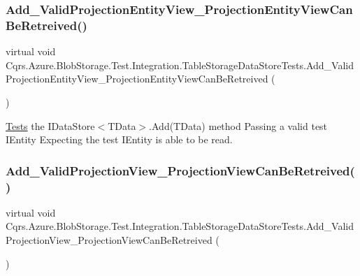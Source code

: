 \subsubsection{\texorpdfstring{Add\+\_\+\+Valid\+Projection\+Entity\+View\+\_\+\+Projection\+Entity\+View\+Can\+Be\+Retreived()}{Add\_ValidProjectionEntityView\_ProjectionEntityViewCanBeRetreived()}}
{\footnotesize\ttfamily virtual void Cqrs.\+Azure.\+Blob\+Storage.\+Test.\+Integration.\+Table\+Storage\+Data\+Store\+Tests.\+Add\+\_\+\+Valid\+Projection\+Entity\+View\+\_\+\+Projection\+Entity\+View\+Can\+Be\+Retreived (\begin{DoxyParamCaption}{ }\end{DoxyParamCaption})\hspace{0.3cm}{\ttfamily [virtual]}}



\hyperlink{namespaceCqrs_1_1Tests}{Tests} the I\+Data\+Store$<$\+T\+Data$>$.\+Add(\+T\+Data) method Passing a valid test I\+Entity Expecting the test I\+Entity is able to be read. 

\mbox{\label{classCqrs_1_1Azure_1_1BlobStorage_1_1Test_1_1Integration_1_1TableStorageDataStoreTests_a4d5cbb9f8690e2eff9529966e6816b5c_a4d5cbb9f8690e2eff9529966e6816b5c}} 
\subsubsection{\texorpdfstring{Add\+\_\+\+Valid\+Projection\+View\+\_\+\+Projection\+View\+Can\+Be\+Retreived()}{Add\_ValidProjectionView\_ProjectionViewCanBeRetreived()}}
{\footnotesize\ttfamily virtual void Cqrs.\+Azure.\+Blob\+Storage.\+Test.\+Integration.\+Table\+Storage\+Data\+Store\+Tests.\+Add\+\_\+\+Valid\+Projection\+View\+\_\+\+Projection\+View\+Can\+Be\+Retreived (\begin{DoxyParamCaption}{ }\end{DoxyParamCaption})\hspace{0.3cm}{\ttfamily [virtual]}}



